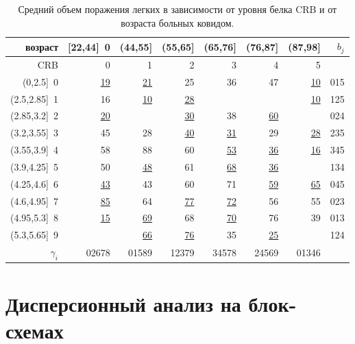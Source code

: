 \documentclass{math-mech-sci}
\begin{document}
\begin{table}[ht]\centering\begin{tabular}{rrrrrrr|r}  
		
		\hline 
		возраст
		& [22,44]~0 & (44,55] & (55,65] & (65,76] & (76,87] & (87,98] &  $b_j$\\  \hline
		CRB  & 0 & 1& 2& 3 & 4 & 5 & \\   \hline
		
		(0,2.5]~0 & \underline{19} & \underline{21} & 25 & 36 & 47 &  \underline{10} &	015\\  
		(2.5,2.85]~1& 16 &  \underline{10}& \underline{28} &  &  &  \underline{10} & 125 \\  
		(2.85,3.2]~2 &  \underline{20}&  & \underline{30} & 38 &  \underline{60} &  & 024 \\  
		(3.2,3.55]~3 & 45 & 28 & \underline{40} & \underline{31}& 29 & \underline{28}  & 235 \\ 
		(3.55,3.9]~4& 58 & 88 & 60 &\underline{53} & \underline{36} & \underline{16}  & 345\\  
		
		(3.9,4.25]~5 & {50} & \underline{48} & {61} & \underline{68}& \underline{36} & & 134 \\  
		(4.25,4.6]~6 & \underline{43} & 43 & 60 & 71 & \underline{59} & \underline{65}   &045\\  
		(4.6,4.95]~7 & \underline{85} & 64 & \underline{77} & \underline{72}& 56 & 55 & 023\\   
		(4.95,5.3]~8 & \underline{15} & \underline{69} & 68 & \underline{70} & 76 & 39 & 013\\   
		(5.3,5.65]~9 &  & \underline{66} & \underline{76} & 35 & \underline{25} &  &124\\   \hline
		$\gamma_i$  &  02678& 01589 & 12379&  34578& 24569& 01346 &\\   
		\hline\end{tabular}
	\caption{Средний объем поражения легких  в зависимости от уровня белка CRB и от возраста больных ковидом.}\label{tab1}\end{table}

\section{Дисперсионный анализ на блок-схемах }
\end{document}
